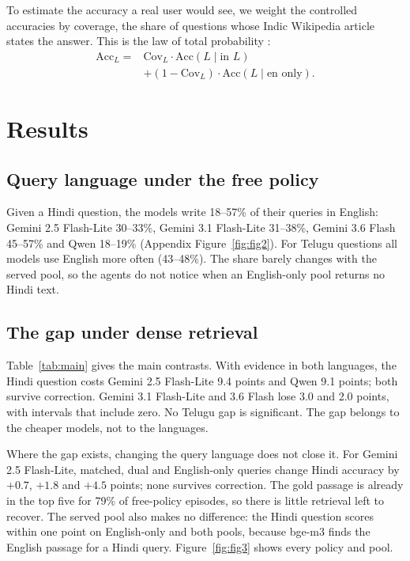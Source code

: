 To estimate the accuracy a real user would see, we weight the controlled accuracies by coverage, the share of questions whose Indic Wikipedia article states the answer. This is the law of total probability \citep{ross2014probability}:
\begin{equation}
\begin{split}
\mathrm{Acc}_L ={}& \mathrm{Cov}_L \cdot \mathrm{Acc}(L \mid \text{in } L)\\
&+ (1-\mathrm{Cov}_L)\cdot \mathrm{Acc}(L \mid \text{en only}).
\end{split}
\label{eq:decomp}
\end{equation}

\section{Results}
\label{sec:results}

\subsection{Query language under the free policy}
\label{sec:results-drift}
Given a Hindi question, the models write 18--57\% of their queries in English: Gemini 2.5 Flash-Lite 30--33\%, Gemini 3.1 Flash-Lite 31--38\%, Gemini 3.6 Flash 45--57\% and Qwen 18--19\% (Appendix Figure~\ref{fig:fig2}). For Telugu questions all models use English more often (43--48\%). The share barely changes with the served pool, so the agents do not notice when an English-only pool returns no Hindi text.

\subsection{The gap under dense retrieval}
\label{sec:results-qg}
Table~\ref{tab:main} gives the main contrasts. With evidence in both languages, the Hindi question costs Gemini 2.5 Flash-Lite 9.4 points and Qwen 9.1 points; both survive correction. Gemini 3.1 Flash-Lite and 3.6 Flash lose 3.0 and 2.0 points, with intervals that include zero. No Telugu gap is significant. The gap belongs to the cheaper models, not to the languages.

Where the gap exists, changing the query language does not close it. For Gemini 2.5 Flash-Lite, matched, dual and English-only queries change Hindi accuracy by $+0.7$, $+1.8$ and $+4.5$ points; none survives correction. The gold passage is already in the top five for 79\% of free-policy episodes, so there is little retrieval left to recover. The served pool also makes no difference: the Hindi question scores within one point on English-only and both pools, because bge-m3 finds the English passage for a Hindi query. Figure~\ref{fig:fig3} shows every policy and pool.

